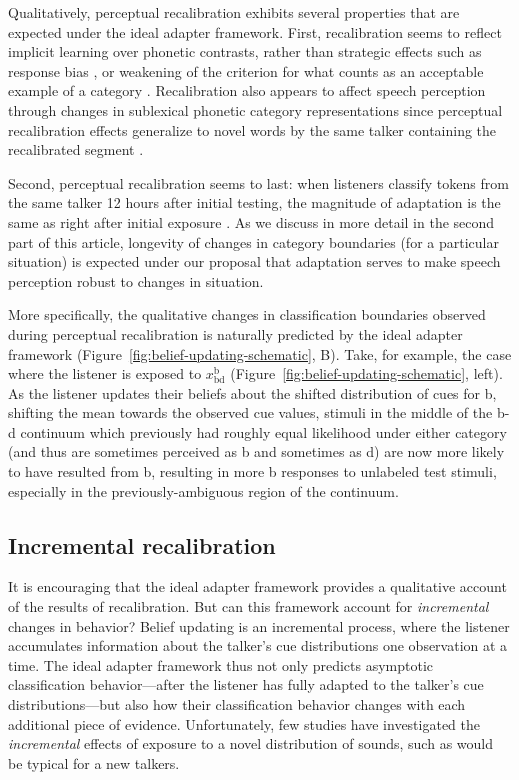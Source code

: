 Qualitatively, perceptual recalibration exhibits several properties that are expected under the ideal adapter framework. First, recalibration seems to reflect implicit learning over phonetic contrasts, rather than strategic effects such as response bias \autocite{Clarke-Davidson2008}, or weakening of the criterion for what counts as an acceptable example of a category \autocite[][but see next section]{Maye2008a}.
Recalibration also appears to affect speech perception through changes in sublexical phonetic category representations since perceptual recalibration effects generalize to novel words by the same talker containing the recalibrated segment \autocite{McQueen2006}.

Second, perceptual recalibration seems to last: when listeners classify tokens from the same talker 12 hours after initial testing, the magnitude of adaptation is the same as right after initial exposure \autocite{Eisner2006}. As we discuss in more detail in the second part of this article, longevity of changes in category boundaries (for a particular situation) is expected under our proposal that adaptation serves to make speech perception robust to changes in situation.

More specifically, the qualitative changes in classification boundaries observed during perceptual recalibration is naturally predicted by the ideal adapter framework (Figure~\ref{fig:belief-updating-schematic}, B).  Take, for example, the case where the listener is exposed to $x_\mathrm{bd}^\mathrm{b}$ (Figure~\ref{fig:belief-updating-schematic}, left).  As the listener updates their beliefs about the shifted distribution of cues for \ph b, shifting the mean towards the observed cue values, stimuli in the middle of the \ph b-\ph d continuum which previously had roughly equal likelihood under either category (and thus are sometimes perceived as \ph b and sometimes as \ph d) are now more likely to have resulted from \ph b, resulting in more \ph b responses to unlabeled test stimuli, especially in the previously-ambiguous region of the continuum.

\subsection{Incremental recalibration}
\label{sec:incr-recal}

It is encouraging that the ideal adapter framework provides a qualitative account of the results of recalibration.  But can this framework account for \emph{incremental} changes in behavior?  Belief updating is an incremental process, where the listener accumulates information about the talker's cue distributions one observation at a time.  The ideal adapter framework thus not only predicts asymptotic classification behavior---after the listener has fully adapted to the talker's cue distributions---but also how their classification behavior changes with each additional piece of evidence.
Unfortunately, few studies have investigated the \emph{incremental} effects of exposure to a novel distribution of sounds, such as would be typical for a new talkers.

